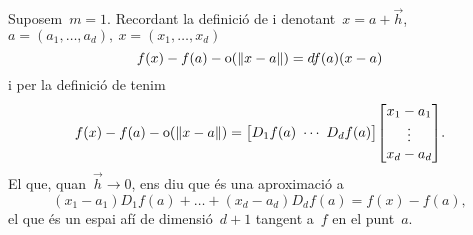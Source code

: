 \documentclass[../../main.tex]{subfiles}
\begin{document}
    \begin{observation}\label{obs:diferencial defineix espai tangent}
        Suposem~\(m=1\).
        Recordant la definició de  i denotant~\(x=a+\vec{h}\),~\(a=(a_{1},\dots,a_{d}),\ x=(x_{1},\dots,x_{d})\)
        \[
            f(x)-f(a)-\omicron(\norm{x-a})=df(a)(x-a)
        \]
        i per la definició de  tenim
        \[f(x)-f(a)-\omicron(\norm{x-a})=
        \left[\begin{matrix}
        D_{1}f(a)~\cdots~D_{d}f(a)
        \end{matrix}\right]
        \left[\begin{matrix}
        x_{1}-a_{1}\\
        \vdots\\
        x_{d}-a_{d}
        \end{matrix}\right].\]
        El que, quan~\(\vec{h}\to0\), ens diu que és una aproximació a
        \[
            (x_{1}-a_{1})D_{1}f(a)+\dots+(x_{d}-a_{d})D_{d}f(a)=f(x)-f(a),
        \]
        el que és un espai afí de dimensió~\(d+1\) tangent a~\(f\) en el punt~\(a\).
    \end{observation}
\end{document}
